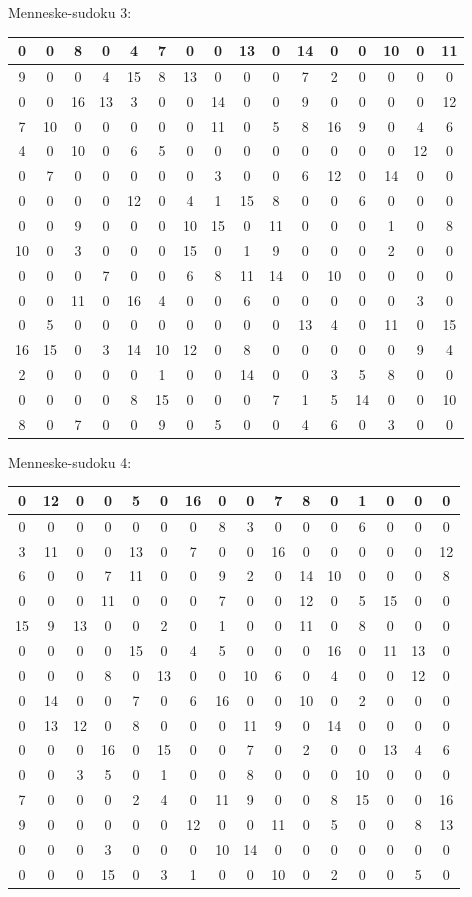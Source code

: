 \documentclass[]{report}
\begin{document}
Menneske-sudoku 3:
\begin{tabular}{|c|c|c|c||c|c|c|c||c|c|c|c||c|c|c|c|}
\hline
0&0&8&0&4&7&0&0&13&0&14&0&0&10&0&11\\\hline
9&0&0&4&15&8&13&0&0&0&7&2&0&0&0&0\\\hline
0&0&16&13&3&0&0&14&0&0&9&0&0&0&0&12\\\hline
7&10&0&0&0&0&0&11&0&5&8&16&9&0&4&6\\\hline\hline
4&0&10&0&6&5&0&0&0&0&0&0&0&0&12&0\\\hline
0&7&0&0&0&0&0&3&0&0&6&12&0&14&0&0\\\hline
0&0&0&0&12&0&4&1&15&8&0&0&6&0&0&0\\\hline
0&0&9&0&0&0&10&15&0&11&0&0&0&1&0&8\\\hline\hline
10&0&3&0&0&0&15&0&1&9&0&0&0&2&0&0\\\hline
0&0&0&7&0&0&6&8&11&14&0&10&0&0&0&0\\\hline
0&0&11&0&16&4&0&0&6&0&0&0&0&0&3&0\\\hline
0&5&0&0&0&0&0&0&0&0&13&4&0&11&0&15\\\hline\hline
16&15&0&3&14&10&12&0&8&0&0&0&0&0&9&4\\\hline
2&0&0&0&0&1&0&0&14&0&0&3&5&8&0&0\\\hline
0&0&0&0&8&15&0&0&0&7&1&5&14&0&0&10\\\hline
8&0&7&0&0&9&0&5&0&0&4&6&0&3&0&0\\\hline
\end{tabular}

Menneske-sudoku 4:
\begin{tabular}{|c|c|c|c||c|c|c|c||c|c|c|c||c|c|c|c|}
\hline
0&12&0&0&5&0&16&0&0&7&8&0&1&0&0&0\\\hline
0&0&0&0&0&0&0&8&3&0&0&0&6&0&0&0\\\hline
3&11&0&0&13&0&7&0&0&16&0&0&0&0&0&12\\\hline
6&0&0&7&11&0&0&9&2&0&14&10&0&0&0&8\\\hline\hline
0&0&0&11&0&0&0&7&0&0&12&0&5&15&0&0\\\hline
15&9&13&0&0&2&0&1&0&0&11&0&8&0&0&0\\\hline
0&0&0&0&15&0&4&5&0&0&0&16&0&11&13&0\\\hline
0&0&0&8&0&13&0&0&10&6&0&4&0&0&12&0\\\hline\hline
0&14&0&0&7&0&6&16&0&0&10&0&2&0&0&0\\\hline
0&13&12&0&8&0&0&0&11&9&0&14&0&0&0&0\\\hline
0&0&0&16&0&15&0&0&7&0&2&0&0&13&4&6\\\hline
0&0&3&5&0&1&0&0&8&0&0&0&10&0&0&0\\\hline\hline
7&0&0&0&2&4&0&11&9&0&0&8&15&0&0&16\\\hline
9&0&0&0&0&0&12&0&0&11&0&5&0&0&8&13\\\hline
0&0&0&3&0&0&0&10&14&0&0&0&0&0&0&0\\\hline
0&0&0&15&0&3&1&0&0&10&0&2&0&0&5&0\\\hline
\end{tabular}
\end{document}
